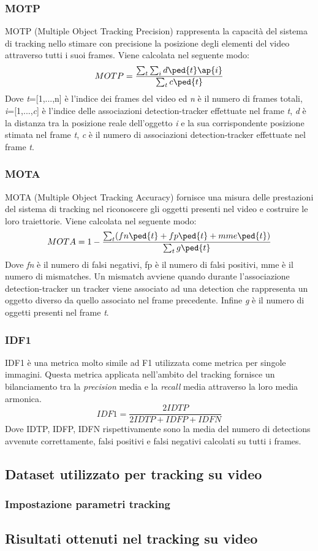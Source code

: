 \subsubsection{MOTP}
MOTP (Multiple Object Tracking Precision) rappresenta la capacità del sistema di tracking nello stimare con precisione la posizione degli elementi del video attraverso tutti i suoi frames. Viene calcolata nel seguente modo:
\[
MOTP = \frac{\sum_{t}^{}\sum_{i}^{}d\ped{t}\ap{i}}{\sum_{t}^{}c\ped{t}}
\]
Dove \textit{t}=[1,...,n] è l'indice dei frames del video ed \textit{n} è il numero di frames totali, \textit{i}=[1,...,\textit{c}] è l'indice delle associazioni detection-tracker effettuate nel frame \textit{t}, \textit{d} è la distanza tra la posizione reale dell'oggetto \textit{i} e la sua corrispondente posizione stimata nel frame \textit{t}, \textit{c} è il numero di associazioni detection-tracker effettuate nel frame \textit{t}.
\subsubsection{MOTA}
MOTA (Multiple Object Tracking Accuracy) fornisce una misura delle prestazioni del sistema di tracking nel riconoscere gli oggetti presenti nel video e costruire le loro traiettorie. Viene calcolata nel seguente modo:
\[
MOTA = 1-\frac{\sum_{t}^{}(fn\ped{t}+fp\ped{t}+mme\ped{t})}{\sum_{t}^{}g\ped{t}}
\]
Dove \textit{fn} è il numero di falsi negativi, fp è il numero di falsi positivi, mme è il numero di mismatches. Un mismatch avviene quando durante l'associazione detection-tracker un tracker viene associato ad una detection che rappresenta un oggetto diverso da quello associato nel frame precedente. Infine  \textit{g} è il numero di oggetti presenti nel frame \textit{t}.
\subsubsection{IDF1}
IDF1 è una metrica molto simile ad F1 utilizzata come metrica per singole immagini. Questa metrica applicata nell'ambito del tracking fornisce un bilanciamento tra la \textit{precision} media e la \textit{recall} media attraverso la loro media armonica. 
\[
IDF1 = \frac{2IDTP}{2IDTP+IDFP+IDFN}
\]
Dove IDTP, IDFP, IDFN rispettivamente sono la media del numero di detections avvenute correttamente, falsi positivi e falsi negativi calcolati su tutti i frames. 

\subsection{Dataset utilizzato per tracking su video}

\subsubsection{Impostazione parametri tracking}


\subsection{Risultati ottenuti nel tracking su video}
